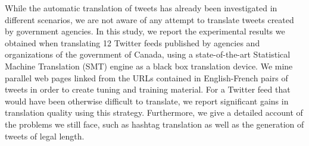 While the automatic translation of tweets has already been investigated in different scenarios, we are not aware of any attempt to translate tweets
 created by government agencies. In this study, we report the experimental
 results we obtained when translating 12 Twitter feeds published by agencies and
 organizations of the government of Canada, using a state-of-the-art Statistical
 Machine Translation (SMT) engine as a black box translation device. We mine
 parallel web pages linked from the URLs contained in English-French pairs of
 tweets in order to create tuning and training material. For a Twitter feed that
 would have been otherwise difficult to translate, we report significant gains
 in translation quality using this strategy. Furthermore, we give a detailed
 account of the problems we still face, such as hashtag translation as well as
 the generation of tweets of legal length.

